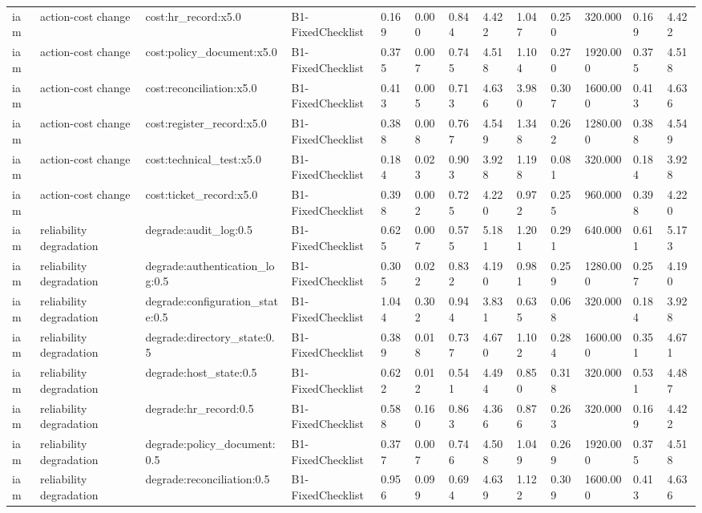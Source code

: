 \begin{table}[!ht]
{\begin{tabular}{lllllllllllll}
iam & action-cost change & cost:hr\_record:x5.0 & B1-FixedChecklist & 0.169 & 0.000 & 0.844 & 4.422 & 1.047 & 0.250 & 320.000 & 0.169 & 4.422 \\
iam & action-cost change & cost:policy\_document:x5.0 & B1-FixedChecklist & 0.375 & 0.007 & 0.745 & 4.518 & 1.104 & 0.270 & 1920.000 & 0.375 & 4.518 \\
iam & action-cost change & cost:reconciliation:x5.0 & B1-FixedChecklist & 0.413 & 0.005 & 0.713 & 4.636 & 3.980 & 0.307 & 1600.000 & 0.413 & 4.636 \\
iam & action-cost change & cost:register\_record:x5.0 & B1-FixedChecklist & 0.388 & 0.008 & 0.767 & 4.549 & 1.348 & 0.262 & 1280.000 & 0.388 & 4.549 \\
iam & action-cost change & cost:technical\_test:x5.0 & B1-FixedChecklist & 0.184 & 0.023 & 0.903 & 3.928 & 1.198 & 0.081 & 320.000 & 0.184 & 3.928 \\
iam & action-cost change & cost:ticket\_record:x5.0 & B1-FixedChecklist & 0.398 & 0.002 & 0.725 & 4.220 & 0.972 & 0.255 & 960.000 & 0.398 & 4.220 \\
iam & reliability degradation & degrade:audit\_log:0.5 & B1-FixedChecklist & 0.625 & 0.007 & 0.575 & 5.181 & 1.201 & 0.291 & 640.000 & 0.611 & 5.173 \\
iam & reliability degradation & degrade:authentication\_log:0.5 & B1-FixedChecklist & 0.305 & 0.022 & 0.832 & 4.190 & 0.981 & 0.259 & 1280.000 & 0.257 & 4.190 \\
iam & reliability degradation & degrade:configuration\_state:0.5 & B1-FixedChecklist & 1.044 & 0.302 & 0.944 & 3.831 & 0.635 & 0.068 & 320.000 & 0.184 & 3.928 \\
iam & reliability degradation & degrade:directory\_state:0.5 & B1-FixedChecklist & 0.389 & 0.018 & 0.737 & 4.670 & 1.102 & 0.284 & 1600.000 & 0.351 & 4.671 \\
iam & reliability degradation & degrade:host\_state:0.5 & B1-FixedChecklist & 0.622 & 0.012 & 0.541 & 4.494 & 0.850 & 0.318 & 320.000 & 0.531 & 4.487 \\
iam & reliability degradation & degrade:hr\_record:0.5 & B1-FixedChecklist & 0.588 & 0.160 & 0.863 & 4.366 & 0.876 & 0.263 & 320.000 & 0.169 & 4.422 \\
iam & reliability degradation & degrade:policy\_document:0.5 & B1-FixedChecklist & 0.377 & 0.007 & 0.746 & 4.508 & 1.049 & 0.269 & 1920.000 & 0.375 & 4.518 \\
iam & reliability degradation & degrade:reconciliation:0.5 & B1-FixedChecklist & 0.956 & 0.099 & 0.694 & 4.639 & 1.122 & 0.309 & 1600.000 & 0.413 & 4.636 \\

\end{tabular}}
\end{table}
